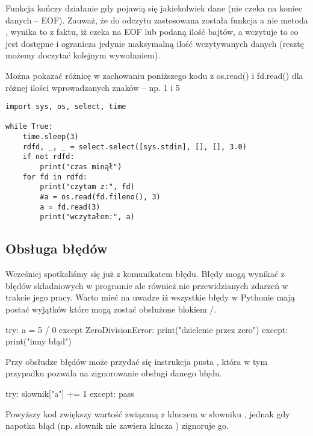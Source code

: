 \documentclass{pdfBooklets}
\begin{document}
Funkcja  kończy działanie gdy pojawią się jakiekolwiek dane (nie czeka na koniec danych – EOF). Zauważ, że do odczytu zastosowana została funkcja  a nie metoda , wynika to z faktu, iż  czeka na EOF lub podaną ilość bajtów, a  wczytuje to co jest dostępne i ogranicza jedynie maksymalną ilość wczytywanych danych (resztę możemy doczytać kolejnym wywołaniem).

\begin{teacherOnly}
Można pokazać różnicę w zachowaniu poniższego kodu z os.read() i fd.read() dla różnej ilości wprowadzanych znaków – np. 1 i 5
\begin{Verbatim}
import sys, os, select, time

while True:
	time.sleep(3)
	rdfd, _, _ = select.select([sys.stdin], [], [], 3.0)
	if not rdfd:
		print("czas minął")
	for fd in rdfd:
		print("czytam z:", fd)
		#a = os.read(fd.fileno(), 3)
		a = fd.read(3)
		print("wczytałem:", a)
\end{Verbatim}
\end{teacherOnly}

\subsection{Obsługa błędów}
Wcześniej spotkaliśmy się już z komunikatem błędu. Błędy mogą wynikać z błędów składniowych w programie ale również nie przewidzianych zdarzeń w trakcie jego pracy.
Warto mieć na uwadze iż wszystkie błędy w Pythonie mają postać wyjątków które mogą zostać obsłużone blokiem /.

\begin{CodeFrame*}[python]{}
try:
  a = 5 / 0
except ZeroDivisionError:
  print("dzielenie przez zero")
except:
  print("inny błąd")
\end{CodeFrame*}

Przy obsłudze błędów może przydać się instrukcja pusta , która w tym przypadku pozwala na zignorowanie obsługi danego błędu.

\begin{CodeFrame*}[python]{}
try:
  slownik["a"] += 1
except:
  pass
\end{CodeFrame*}

Powyższy kod zwiększy wartość związaną z kluczem  w słowniku , jednak gdy napotka błąd (np. słownik nie zawiera klucza ) zignoruje go.
\end{document}
